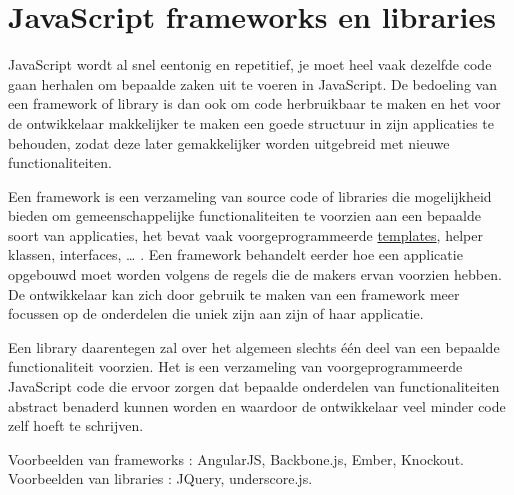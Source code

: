  \section{JavaScript frameworks en libraries} \label{section:frameworkslibraries}

JavaScript wordt al snel eentonig en repetitief, je moet heel vaak dezelfde code gaan herhalen om bepaalde zaken uit te voeren in JavaScript. De bedoeling van een framework of library is dan ook om code herbruikbaar te maken en het voor de ontwikkelaar makkelijker te maken een goede structuur in zijn applicaties te behouden, zodat deze later gemakkelijker worden uitgebreid met nieuwe functionaliteiten.
 
Een framework is een verzameling van source code of libraries die mogelijkheid bieden om gemeenschappelijke functionaliteiten te voorzien aan een bepaalde soort van applicaties, het bevat vaak voorgeprogrammeerde \hyperref[template]{templates}, helper klassen, interfaces, … . Een framework behandelt eerder hoe een applicatie opgebouwd moet worden volgens de regels die de makers ervan voorzien hebben. De ontwikkelaar kan zich door gebruik te maken van een framework meer focussen op de onderdelen die uniek zijn aan zijn of haar applicatie.

Een library daarentegen zal over het algemeen slechts één deel van een bepaalde functionaliteit voorzien. Het is een verzameling van voorgeprogrammeerde JavaScript code die ervoor zorgen dat bepaalde onderdelen van functionaliteiten abstract benaderd kunnen worden en waardoor de ontwikkelaar veel minder code zelf hoeft te schrijven. \citep{docforge:Javascript}

Voorbeelden van frameworks : AngularJS, Backbone.js, Ember, Knockout.
Voorbeelden van libraries : JQuery, underscore.js.



